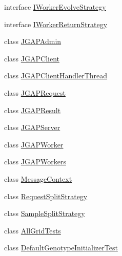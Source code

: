 \begin{DoxyCompactItemize}
\item 
interface \hyperlink{interfaceorg_1_1jgap_1_1distr_1_1grid_1_1_i_worker_evolve_strategy}{I\-Worker\-Evolve\-Strategy}
\item 
interface \hyperlink{interfaceorg_1_1jgap_1_1distr_1_1grid_1_1_i_worker_return_strategy}{I\-Worker\-Return\-Strategy}
\item 
class \hyperlink{classorg_1_1jgap_1_1distr_1_1grid_1_1_j_g_a_p_admin}{J\-G\-A\-P\-Admin}
\item 
class \hyperlink{classorg_1_1jgap_1_1distr_1_1grid_1_1_j_g_a_p_client}{J\-G\-A\-P\-Client}
\item 
class \hyperlink{classorg_1_1jgap_1_1distr_1_1grid_1_1_j_g_a_p_client_handler_thread}{J\-G\-A\-P\-Client\-Handler\-Thread}
\item 
class \hyperlink{classorg_1_1jgap_1_1distr_1_1grid_1_1_j_g_a_p_request}{J\-G\-A\-P\-Request}
\item 
class \hyperlink{classorg_1_1jgap_1_1distr_1_1grid_1_1_j_g_a_p_result}{J\-G\-A\-P\-Result}
\item 
class \hyperlink{classorg_1_1jgap_1_1distr_1_1grid_1_1_j_g_a_p_server}{J\-G\-A\-P\-Server}
\item 
class \hyperlink{classorg_1_1jgap_1_1distr_1_1grid_1_1_j_g_a_p_worker}{J\-G\-A\-P\-Worker}
\item 
class \hyperlink{classorg_1_1jgap_1_1distr_1_1grid_1_1_j_g_a_p_workers}{J\-G\-A\-P\-Workers}
\item 
class \hyperlink{classorg_1_1jgap_1_1distr_1_1grid_1_1_message_context}{Message\-Context}
\item 
class \hyperlink{classorg_1_1jgap_1_1distr_1_1grid_1_1_request_split_strategy}{Request\-Split\-Strategy}
\item 
class \hyperlink{classorg_1_1jgap_1_1distr_1_1grid_1_1_sample_split_strategy}{Sample\-Split\-Strategy}
\item 
class \hyperlink{classorg_1_1jgap_1_1distr_1_1grid_1_1_all_grid_tests}{All\-Grid\-Tests}
\item 
class \hyperlink{classorg_1_1jgap_1_1distr_1_1grid_1_1_default_genotype_initializer_test}{Default\-Genotype\-Initializer\-Test}
\end{DoxyCompactItemize}

